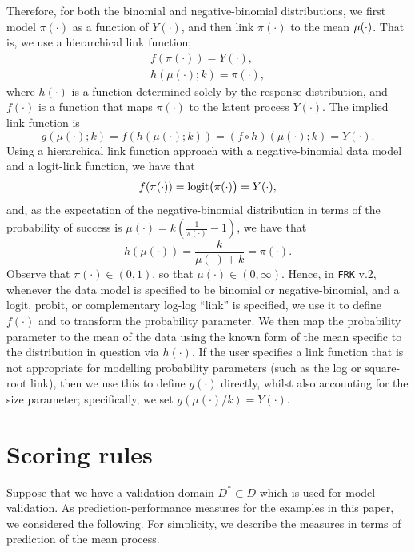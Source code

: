 \documentclass[12pt,a4paper]{article}
\begin{document}
\begin{appendices}
Therefore, for both the binomial and negative-binomial distributions, we first model $\pi(\cdot)$ as a function of $Y(\cdot)$, and then link $\pi(\cdot)$ to the mean $\mu(\cdot)$. 
That is, we use a hierarchical link function;
\begin{gather*}
    f(\pi(\cdot)) = Y(\cdot),\\
    h(\mu(\cdot); k) = \pi(\cdot), 
\end{gather*}
where $h(\cdot)$ is a function determined solely by the response distribution, and $f(\cdot)$ is a function that maps $\pi(\cdot)$ to the latent process $Y(\cdot)$.  
The implied link function is
\[
g(\mu(\cdot); k) = f(h(\mu(\cdot); k)) = (f \circ h)(\mu(\cdot); k) = Y(\cdot).
\]
Using a hierarchical link function approach with a negative-binomial data model and a logit-link function, we have that
\[
f(\pi(\cdot)) = \text{logit}\!\left(\pi(\cdot)\right) = Y(\cdot),
\]
and, as the expectation of the negative-binomial distribution in terms of the probability of success is $\mu(\cdot) = k\left(\frac{1}{\pi(\cdot)} - 1\right)$, we have that
\[
h(\mu(\cdot)) = \frac{k}{\mu(\cdot) + k} = \pi(\cdot).
\]
Observe that $\pi(\cdot) \in (0, 1)$, so that $\mu(\cdot) \in (0, \infty)$. 
Hence, in \texttt{FRK} v.2, whenever the data model is specified to be binomial or negative-binomial, and a logit, probit, or complementary log-log ``link'' is specified, we use it to define $f(\cdot)$ and to transform the probability parameter. 
We then map the probability parameter to the mean of the data using the known form of the mean specific to the distribution in question via $h(\cdot)$. 
If the user specifies a link function  that is not appropriate for modelling probability parameters (such as the log or square-root link), then we use this to define $g(\cdot)$ directly, whilst also accounting for the size parameter; specifically, we set $g(\mu(\cdot) / k) = Y(\cdot)$.


\section{Scoring rules}\label{app:ScoringRules}

Suppose that we have a validation domain $D^* \subset D$ which is used for model validation.
As prediction-performance measures for the examples in this paper, we considered the following. 
For simplicity, we describe the measures in terms of prediction of the mean process.



\end{appendices}
\end{document}
